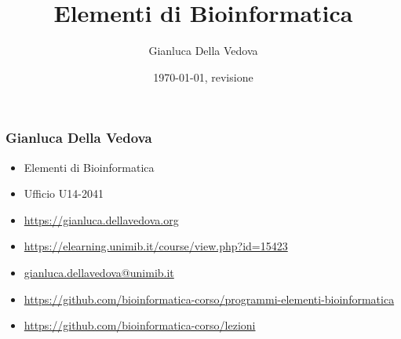 \usepackage[italian]{babel}
\usepackage[utf8]{inputenc}
\usepackage{pgf}
\usepackage{verbatim}
\usepackage{inconsolata}
\usepackage{listings}


\usepackage{pgf}
\usepackage{tikz}
\usepackage{graphicx}
\usetikzlibrary{%
  arrows,
  arrows.meta,
  positioning,
  calc,
  backgrounds,
  chains,
  matrix,
  patterns,
  automata,
  fit,
  graphs,
  decorations,
  decorations.pathmorphing,
  decorations.pathreplacing,
  decorations.markings,
}



\usepackage{url}
\usepackage{xmpmulti}
\usepackage[T1]{fontenc}
\immediate{}


\author{Gianluca Della Vedova}
\title{Elementi di Bioinformatica}
\date{\today, {\tiny revisione \VCRevision}}



\beamerdefaultoverlayspecification{<+->}

\graphicspath{{figures/}}



\begin{frame}
  \titlepage
\end{frame}


\begin{frame}\frametitle{Gianluca Della Vedova}
\begin{itemize}
\item
Elementi di Bioinformatica
\item
Ufficio U14-2041
\item
\url{https://gianluca.dellavedova.org}
\item
\url{https://elearning.unimib.it/course/view.php?id=15423}
\item
\url{gianluca.dellavedova@unimib.it}
\item\url{https://github.com/bioinformatica-corso/programmi-elementi-bioinformatica}
\item\url{https://github.com/bioinformatica-corso/lezioni}
\end{itemize}
\end{frame}

